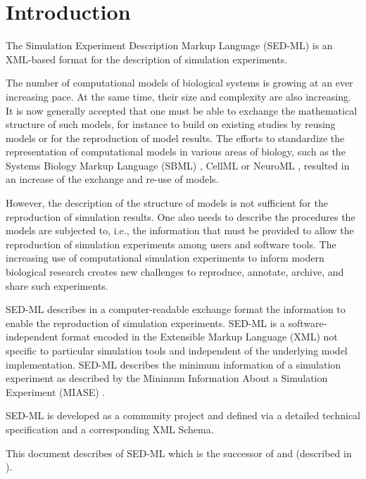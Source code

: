\chapter{Introduction}
The Simulation Experiment Description Markup Language (SED-ML) is an XML-based format for the description of simulation experiments.

The number of computational models of biological systems is growing at an ever increasing pace. 
At the same time, their size and complexity are also increasing. It is now generally accepted that one must be able to exchange the mathematical structure of such models, for instance to build on existing studies by reusing models or for the reproduction of model results. The efforts to standardize the representation of computational models in various areas of biology, such as the Systems Biology Markup Language (SBML) \citep{Hucka:2003}, CellML \citep{cuellar:2003} or NeuroML \citep{Goddard:2001}, resulted in an increase of the exchange and re-use of models. 

However, the description of the structure of models is not sufficient for the reproduction of simulation results. One also needs to describe the procedures the models are subjected to, i.e., the information that must be provided to allow the reproduction of simulation experiments among users and software tools. The increasing use of computational simulation experiments to inform modern biological research creates new challenges to reproduce, annotate, archive, and share such experiments. 

SED-ML describes in a computer-readable exchange format the information to enable the reproduction of simulation experiments. SED-ML is a software-independent format encoded in the Extensible Markup Language (XML) not specific to particular simulation tools and independent of the underlying model implementation. SED-ML describes the minimum information of a simulation experiment as described by the Minimum Information About a Simulation Experiment (MIASE) \citep{Waltemath:2011}.

SED-ML is developed as a community project and defined via a detailed technical specification and a corresponding XML Schema. 

This document describes \currentLV of SED-ML which is the successor of \previousLV and \LoneVone (described in \citep{WAB+11}).

